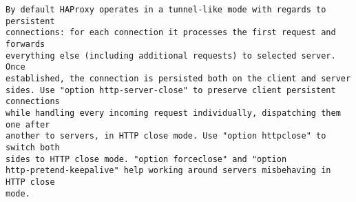 \begin{verbatim}
By default HAProxy operates in a tunnel-like mode with regards to persistent
connections: for each connection it processes the first request and forwards
everything else (including additional requests) to selected server. Once
established, the connection is persisted both on the client and server
sides. Use "option http-server-close" to preserve client persistent connections
while handling every incoming request individually, dispatching them one after
another to servers, in HTTP close mode. Use "option httpclose" to switch both
sides to HTTP close mode. "option forceclose" and "option
http-pretend-keepalive" help working around servers misbehaving in HTTP close
mode.


\end{verbatim}
